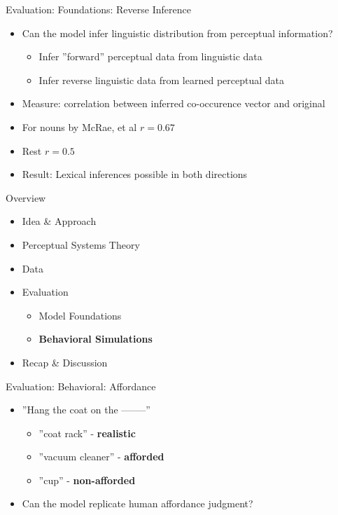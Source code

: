 \documentclass[12pt,a4paper]{beamer}
\begin{document}
\begin{frame}{Evaluation: Foundations: Reverse Inference}
\begin{itemize}
\item Can the model infer linguistic distribution from perceptual information?
    \begin{itemize}
    \item Infer ''forward'' perceptual data from linguistic data
    \item Infer reverse linguistic data from learned perceptual data
    \end{itemize}
\item Measure: correlation between inferred co-occurence vector and original
\item For nouns by McRae, et al $r = 0.67$
\item Rest $r = 0.5$
\item Result: Lexical inferences possible in both directions
\end{itemize}
\end{frame}


\begin{frame}{Overview}
\begin{itemize}
\item Idea \& Approach 
\item Perceptual Systems Theory
\item Data
\item Evaluation
    \begin{itemize}
    \item Model Foundations
    \item \textbf{Behavioral Simulations}
    \end{itemize}
\item Recap \& Discussion
\end{itemize}
\end{frame}


\begin{frame}{Evaluation: Behavioral: Affordance}
\begin{itemize}
\item ''Hang the coat on the --------''
    \begin{itemize}
    \item ''coat rack'' - \textbf{realistic}
    \item ''vacuum cleaner'' - \textbf{afforded}
    \item ''cup'' - \textbf{non-afforded}
    \end{itemize}
\item Can the model replicate human affordance judgment?
\end{itemize}

\end{frame}
\end{document}
